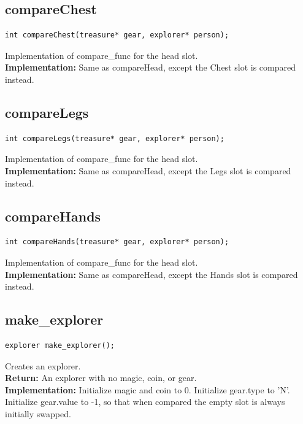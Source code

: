 \documentclass{article}
\begin{document}
\subsection{compareChest}
\begin{lstlisting}
int compareChest(treasure* gear, explorer* person);
\end{lstlisting}


  Implementation of  compare\_func for the head slot.\\ 
 
 
 \textbf{Implementation:}
Same as  compareHead, except the Chest slot is compared instead.
 

\subsection{compareLegs}
\begin{lstlisting}
int compareLegs(treasure* gear, explorer* person);
\end{lstlisting}


  Implementation of  compare\_func for the head slot.\\ 
 
 
 \textbf{Implementation:}
Same as  compareHead, except the Legs slot is compared instead.
 

\subsection{compareHands}
\begin{lstlisting}
int compareHands(treasure* gear, explorer* person);
\end{lstlisting}


  Implementation of  compare\_func for the head slot.\\ 
 
 
 \textbf{Implementation:}
Same as  compareHead, except the Hands slot is compared instead.
 

\subsection{make\_explorer}
\begin{lstlisting}
explorer make_explorer();
\end{lstlisting}


  Creates an explorer.\\ 
 \textbf{Return:} An explorer with no magic, coin, or gear.\\ 
 
 
 \textbf{Implementation:}
Initialize magic and coin to 0.
Initialize gear.type to 'N'.
Initialize gear.value to -1, so that when compared
the empty slot is always initially swapped.
 
\end{document}
